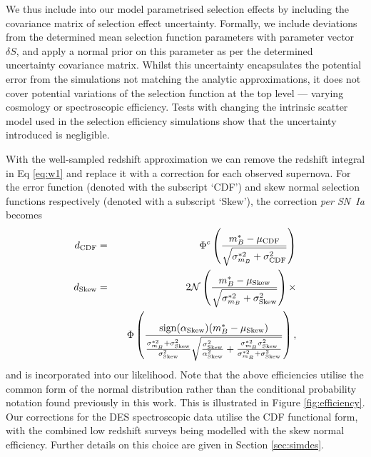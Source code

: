 \documentclass[a4paper,fleqn,usenatbib,manuscript]{emulateapj}
\newcommand{\blue}{\color{blue}}
\begin{document}
We thus include into our model parametrised selection effects by including the covariance matrix of selection effect uncertainty. Formally, we include deviations from the determined mean selection function parameters with parameter vector $\delta S$, and apply a normal prior on this parameter as per the determined uncertainty covariance matrix.  Whilst this uncertainty encapsulates the potential error from the simulations not matching the analytic approximations, it does not cover potential variations of the selection function at the top level --- varying cosmology or spectroscopic efficiency. Tests with changing the intrinsic scatter model used in the selection efficiency simulations show that the uncertainty introduced is negligible.


With the well-sampled redshift approximation we can remove the redshift integral in Eq \eqref{eq:w1} and replace it with a correction for each observed supernova. For the error function (denoted with the subscript `CDF') and skew normal selection functions respectively (denoted with a subscript `Skew'), the correction \textit{per SN~Ia} becomes
\begin{eqnarray}
d_{\rm CDF} &=& \Phi^c\left(  \frac{m^*_B - \mu_{\rm CDF}}{\sqrt{\sigma^{*2}_{m_B} + \sigma_{\rm CDF}^2}}  \right) \label{eq:seldes}\\
d_{\rm Skew} &=& 2\mathcal{N}\left( \frac{m_B^* - \mu_{\rm Skew}}{\sqrt{\sigma^{*2}_{m_B} + \sigma_{\rm Skew}^2}}\right) \times \notag\\
&\quad\quad& \Phi\left(  \frac{{\rm sign}(\alpha_{\rm Skew})(m_B^* - \mu_{\rm Skew})}{\frac{\sigma_{m_B}^{*2} + \sigma^2_{\rm Skew}}{\sigma^2_{\rm Skew}} \sqrt{\frac{\sigma^2_{\rm Skew}}{\alpha^2_{\rm Skew}} + \frac{\sigma_{m_B}^{*2} \sigma^2_{\rm Skew}}{\sigma_{m_B}^{*2} + \sigma^2_{\rm Skew}}} }\right), \label{eq:sellow-$z$}
\end{eqnarray}
and is incorporated into our likelihood. {\blue Note that the above efficiencies utilise the common form of the normal distribution rather than the conditional probability notation found previously in this work.} This is illustrated in Figure \ref{fig:efficiency}. Our corrections for the DES spectroscopic data utilise the CDF functional form, with the combined low redshift surveys being modelled with the skew normal efficiency. Further details on this choice are given in Section \ref{sec:simdes}.
\end{document}
